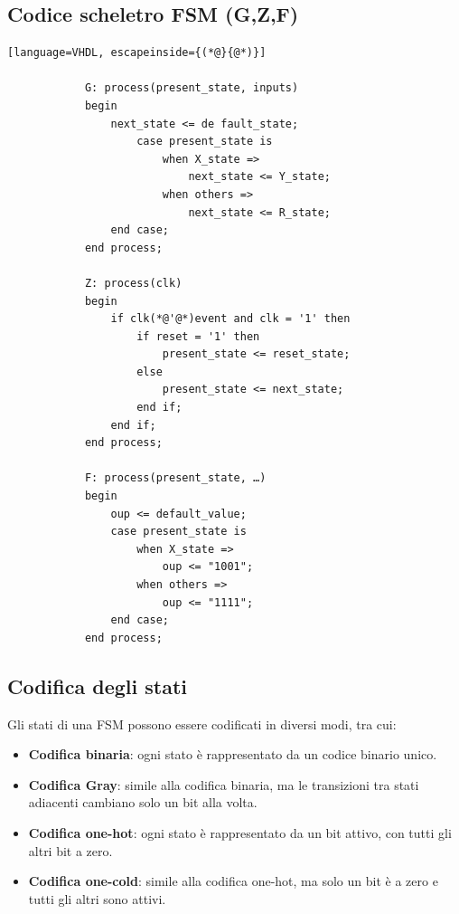     \subsection{Codice scheletro FSM (G,Z,F)}
        \begin{lstlisting}[language=VHDL, escapeinside={(*@}{@*)}]

            G: process(present_state, inputs)
            begin
                next_state <= de fault_state;
                    case present_state is
                        when X_state =>
                            next_state <= Y_state;
                        when others =>
                            next_state <= R_state;
                end case;
            end process;

            Z: process(clk)
            begin
                if clk(*@'@*)event and clk = '1' then
                    if reset = '1' then
                        present_state <= reset_state;
                    else
                        present_state <= next_state;
                    end if;
                end if;
            end process;

            F: process(present_state, …)
            begin
                oup <= default_value;
                case present_state is
                    when X_state =>
                        oup <= "1001";
                    when others =>
                        oup <= "1111";
                end case;
            end process;

        \end{lstlisting}


    \subsection{Codifica degli stati}
    Gli stati di una FSM possono essere codificati in diversi modi, tra cui:
    \begin{itemize}
        \item \textbf{Codifica binaria}: ogni stato è rappresentato da un codice binario unico.
        \item \textbf{Codifica Gray}: simile alla codifica binaria, ma le transizioni tra stati adiacenti cambiano solo un bit alla volta.
        \item \textbf{Codifica one-hot}: ogni stato è rappresentato da un bit attivo, con tutti gli altri bit a zero.
        \item \textbf{Codifica one-cold}: simile alla codifica one-hot, ma solo un bit è a zero e tutti gli altri sono attivi.
    \end{itemize}